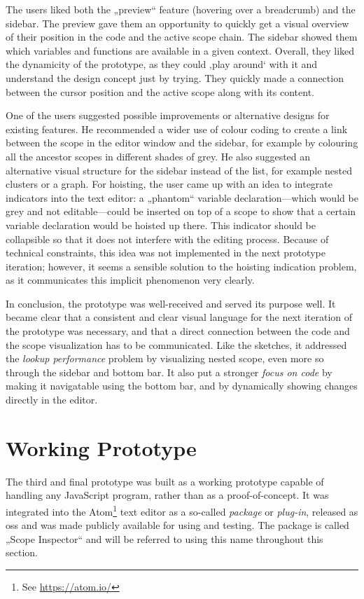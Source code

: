 The users liked both the „preview“ feature (hovering over a breadcrumb)
and the sidebar. The preview gave them an opportunity to quickly get a
visual overview of their position in the code and the active scope
chain. The sidebar showed them which variables and functions are
available in a given context. Overall, they liked the dynamicity of the
prototype, as they could ‚play around‘ with it and understand the design
concept just by trying. They quickly made a connection between the
cursor position and the active scope along with its content.

One of the users suggested possible improvements or alternative designs
for existing features. He recommended a wider use of colour coding to
create a link between the scope in the editor window and the sidebar,
for example by colouring all the ancestor scopes in different shades of
grey. He also suggested an alternative visual structure for the sidebar
instead of the list, for example nested clusters or a graph. For
hoisting, the user came up with an idea to integrate indicators into the
text editor: a „phantom“ variable declaration—which would be grey and
not editable—could be inserted on top of a scope to show that a certain
variable declaration would be hoisted up there. This indicator should be
collapsible so that it does not interfere with the editing process.
Because of technical constraints, this idea was not implemented in the
next prototype iteration; however, it seems a sensible solution to the
hoisting indication problem, as it communicates this implicit phenomenon
very clearly.

In conclusion, the prototype was well-received and served its purpose
well. It became clear that a consistent and clear visual language for
the next iteration of the prototype was necessary, and that a direct
connection between the code and the scope visualization has to be
communicated. Like the sketches, it addressed the \emph{lookup
performance} problem by visualizing nested scope, even more so through
the sidebar and bottom bar. It also put a stronger \emph{focus on code}
by making it navigatable using the bottom bar, and by dynamically
showing changes directly in the editor.

\newpage

\section{Working Prototype}\label{working-prototype}

The third and final prototype was built as a working prototype capable
of handling any JavaScript program, rather than as a proof-of-concept.
It was integrated into the Atom\footnote{See \url{https://atom.io/}}
text editor as a so-called \emph{package} or \emph{plug-in}, released as
\gls{oss} and was made publicly available for using and testing. The
package is called „Scope Inspector“ and will be referred to using this
name throughout this section.

